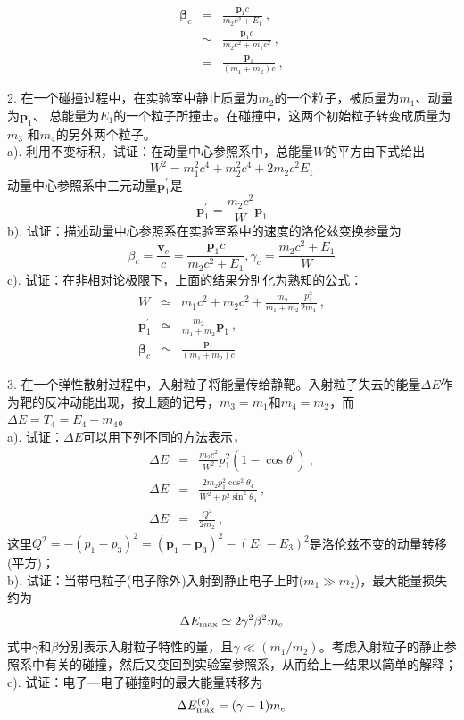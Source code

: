 \documentclass[11pt,a4paper]{article}
\renewcommand{\vec}[1]{\boldsymbol{#1}}
\begin{document}
\begin{eqnarray*}
\nonumber \vec{\beta}_c &=&  \frac{\vec{p}_1 c}{m_2 c^2 +E_1} ~, \\
\nonumber &\sim& \frac{\vec{p}_1 c}{m_2 c^2 +m_1 c^2} ~, \\
\nonumber &=&  \frac{\vec{p}_1}{(m_1 +m_2) c} ~,
\end{eqnarray*}

2. 在一个碰撞过程中，在实验室中静止质量为$m_2$的一个粒子，被质量为$m_1$、动量为$\vec{p}_1$、 总能量为$E_1$的一个粒子所撞击。在碰撞中，这两个初始粒子转变成质量为$m_3$ 和$m_4$的另外两个粒子。\\
a). 利用不变标积，试证：在动量中心参照系中，总能量$W$的平方由下式给出
\begin{equation*}
W^2 = m_1^2 c^4 +m_2^2 c^4+2m_2 c^2 E_1
\end{equation*}
动量中心参照系中三元动量$\vec{p}^{\prime}_1$是
\begin{equation*}
\vec{p}^{\prime}_1 = \frac{m_2 c^2}{W} \vec{p}_1
\end{equation*}
b). 试证：描述动量中心参照系在实验室系中的速度的洛伦兹变换参量为
\begin{equation*}
\beta_c = \frac{\vec{v}_c}{c} = \frac{\vec{p}_1c }{m_2 c^2 +E_1}, \gamma_c = \frac{m_2 c^2 +E_1}{W}
\end{equation*}
c). 试证：在非相对论极限下，上面的结果分别化为熟知的公式：
\begin{eqnarray*}
W &\simeq& m_1 c^2 +m_2 c^2 +\frac{m_2}{m_1 +m_2} \frac{p_1^2}{2m_1} ~, \\
\vec{p}^{\prime}_1 &\simeq& \frac{m_2}{m_1 +m_2} \vec{p}_1 ~, \\
\vec{\beta}_c &\simeq& \frac{\vec{p}_1}{(m_1 +m_2) c}
\end{eqnarray*}


3. 在一个弹性散射过程中，入射粒子将能量传给静靶。入射粒子失去的能量$\Delta E$作为靶的反冲动能出现，按上题的记号，$m_3 = m_1$和$m_4 = m_2$，而$\Delta E = T_4 = E_4 -m_4$。\\
a). 试证：$\Delta E$可以用下列不同的方法表示，
\begin{eqnarray*}
\Delta E &=& \frac{m_2 c^2}{W^2} p^2_1 (1 -\cos \theta^{\prime}) ~, \\
\Delta E &=& \frac{2m_2 p^2_1 \cos^2 \theta_4}{W^2 +p^2_1 \sin^2 \theta_4} ~, \\
\Delta E &=& \frac{Q^2}{2m_2} ~,
\end{eqnarray*}
这里$Q^2 = -(p_1 -p_3)^2 = (\vec{p}_1 -\vec{p}_3)^2 -(E_1 -E_3)^2$是洛伦兹不变的动量转移(平方)；\\
b). 试证：当带电粒子(电子除外)入射到静止电子上时($m_1 \gg m_2$)，最大能量损失约为
\begin{equation*}
\Delta E_{\rm max} \simeq 2\gamma^2 \beta^2 m_e
\end{equation*}
式中$\gamma$和$\beta$分别表示入射粒子特性的量，且$\gamma \ll (m_1/m_2)$。考虑入射粒子的静止参照系中有关的碰撞，然后又变回到实验室参照系，从而给上一结果以简单的解释；\\
c). 试证：电子—电子碰撞时的最大能量转移为
\begin{equation*}
\Delta E_{\rm max}^{(e)} = (\gamma -1) m_e
\end{equation*}
\end{document}
